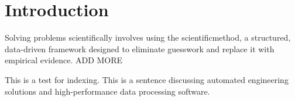 \chapter{Introduction}
\label{ch:introduction}

Solving problems scientifically involves using the \gls{scientificmethod}, a structured, data-driven framework designed to eliminate guesswork and replace it with empirical evidence. ADD MORE

This is a test for indexing. This is a sentence discussing automated engineering solutions and high-performance data processing software.
